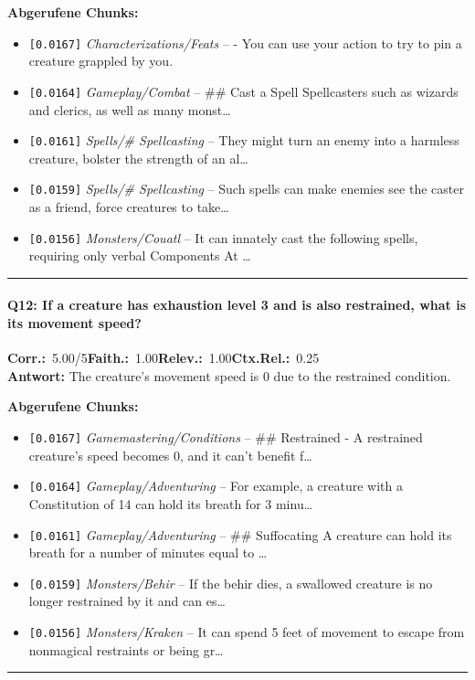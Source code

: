 \noindent\textbf{Abgerufene Chunks:}
\begin{itemize}[noitemsep, topsep=2pt]
  \item[\textbf{\#1}] \texttt{[0.0167]} \textit{Characterizations/Feats} -- - You can use your action to try to pin a creature grappled by you.
  \item[\textbf{\#2}] \texttt{[0.0164]} \textit{Gameplay/Combat} -- \#\# Cast a Spell  Spellcasters such as wizards and clerics, as well as many monst\ldots
  \item[\textbf{\#3}] \texttt{[0.0161]} \textit{Spells/# Spellcasting} -- They might turn an enemy into a harmless creature, bolster the strength of an al\ldots
  \item[\textbf{\#4}] \texttt{[0.0159]} \textit{Spells/# Spellcasting} -- Such spells can make enemies see the caster as a friend, force creatures to take\ldots
  \item[\textbf{\#5}] \texttt{[0.0156]} \textit{Monsters/Couatl} -- It can innately cast the following spells, requiring only verbal Components  At \ldots
\end{itemize}
\vspace{4pt}
\hrule
\vspace{6pt}

\paragraph{Q12: If a creature has exhaustion level 3 and is also restrained, what is its movement speed?}
\noindent \textbf{Corr.:}~5.00/5\quad \textbf{Faith.:}~1.00\quad \textbf{Relev.:}~1.00\quad \textbf{Ctx.Rel.:}~0.25\\

\noindent\textbf{Antwort:} The creature's movement speed is 0 due to the restrained condition.

\noindent\textbf{Abgerufene Chunks:}
\begin{itemize}[noitemsep, topsep=2pt]
  \item[\textbf{\#1}] \texttt{[0.0167]} \textit{Gamemastering/Conditions} -- \#\# Restrained  - A restrained creature's speed becomes 0, and it can't benefit f\ldots
  \item[\textbf{\#2}] \texttt{[0.0164]} \textit{Gameplay/Adventuring} -- For example, a creature with a Constitution of 14 can hold its breath for 3 minu\ldots
  \item[\textbf{\#3}] \texttt{[0.0161]} \textit{Gameplay/Adventuring} -- \#\# Suffocating  A creature can hold its breath for a number of minutes equal to \ldots
  \item[\textbf{\#4}] \texttt{[0.0159]} \textit{Monsters/Behir} -- If the behir dies, a swallowed creature is no longer restrained by it and can es\ldots
  \item[\textbf{\#5}] \texttt{[0.0156]} \textit{Monsters/Kraken} -- It can spend 5 feet of movement to escape from nonmagical restraints or being gr\ldots
\end{itemize}
\vspace{4pt}
\hrule
\vspace{6pt}

